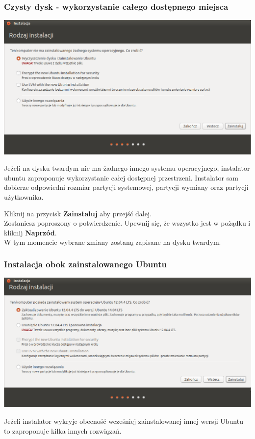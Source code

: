 \subsubsection{Czysty dysk - wykorzystanie całego dostępnego miejsca}
\begin{center}
	\includegraphics[scale=0.5]{images/instalator_partycjonowanie_proste.png}
\end{center}

Jeżeli na dysku twardym nie ma żadnego innego systemu operacyjnego, instalator ubuntu zaproponuje wykorzystanie całej dostępnej przestrzeni. Instalator sam dobierze odpowiedni rozmiar partycji systemowej, partycji wymiany oraz partycji użytkownika.
\begin{flushright}
Kliknij na przycisk \textbf{Zainstaluj} aby przejść dalej.\\
Zostaniesz poproszony o potwierdzenie. Upewnij się, że wszystko jest w pożądku i kliknij \textbf{Naprzód}.\\
W tym momencie wybrane zmiany zostaną zapisane na dysku twardym.
\end{flushright}
\clearpage

\subsubsection{Instalacja obok zainstalowanego Ubuntu}
\begin{center}
	\includegraphics[scale=0.5]{images/instalator_partycjonowanie_obok_ubuntu.png}
\end{center}
Jeżeli instalator wykryje obecność wcześniej zainstalowanej innej wersji Ubuntu to zaproponuje kilka innych rozwiązań.

